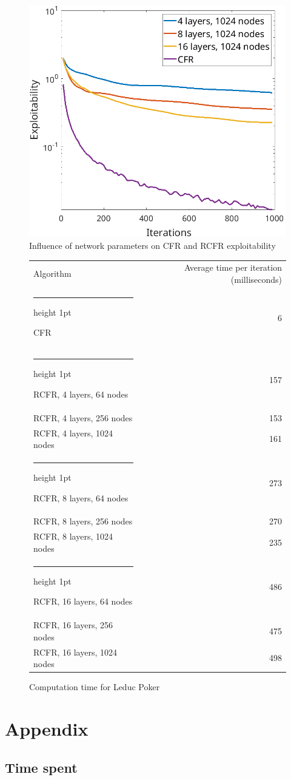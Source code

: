 \documentclass[10pt,a4paper]{article}
\makeatletter
\newcommand{\thickhline}{%
    \noalign {\ifnum 0=`}\fi \hrule height 1pt
    \futurelet \reserved@a \@xhline
}
\makeatother
\begin{document}
\begin{figure}[h]
\includegraphics[scale=0.26]{Figures/rcfr_leduc_parameters3.png}
\caption{Influence of network parameters on CFR and RCFR exploitability}
\label{fig:rcfr_kuhn}
\end{figure}
\FloatBarrier 

\FloatBarrier
\begin{figure}
	\centering
	\begin{tabular}{|l|r|}
	\hline
	Algorithm & Average time per iteration (milliseconds)\\
	\thickhline
	CFR & 6 \\
	\thickhline
	RCFR, 4 layers, 64 nodes& 157 \\
	\hline
	RCFR, 4 layers, 256 nodes & 153 \\
	\hline
	RCFR, 4 layers, 1024 nodes & 161 \\
	\thickhline
	RCFR, 8 layers, 64 nodes & 273 \\
	\hline
	RCFR, 8 layers, 256 nodes  & 270 \\
	\hline
	RCFR, 8 layers, 1024 nodes  & 235 \\
	\thickhline
	RCFR, 16 layers, 64 nodes & 486 \\
	\hline
	RCFR, 16 layers, 256 nodes & 475 \\
	\hline
	RCFR, 16 layers, 1024 nodes & 498 \\
	\hline
	\end{tabular}
	\caption{Computation time for Leduc Poker}
	\label{tbl:kuhn_times}
\end{figure}
\FloatBarrier



\section*{Appendix}
\subsection{Time spent}
\end{document}
